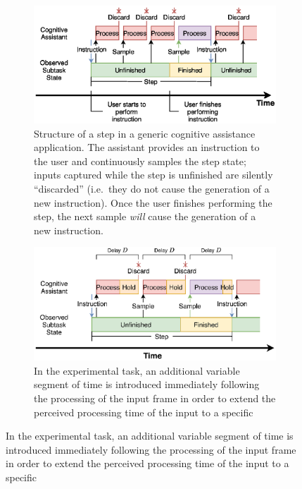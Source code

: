 \begin{figure}[h]
    \centering
    \begin{subfigure}[t]{.49\textwidth}
        \centering
        \includegraphics[width=\textwidth]{publications/2021ImpactDelayedResponse/Fig4a.eps}
        \caption{Structure of a step in a generic cognitive assistance application.
        The assistant provides an instruction to the user and continuously samples the step state; inputs captured
        while the step is unfinished are silently ``discarded'' (i.e.\ they do not cause the generation of a new
        instruction).
        Once the user finishes performing the step, the next sample \emph{will} cause the generation of a new
        instruction.
        }
        \label{fig:cogassist:step}
    \end{subfigure}%
    \hfill%
    \begin{subfigure}[t]{.49\textwidth}
        \centering
        \includegraphics[width=\textwidth]{publications/2021ImpactDelayedResponse/Fig4b.eps}
        \caption{In the experimental task, an additional variable segment of time is introduced immediately following
        the processing of the input frame in order to extend the perceived processing time of the input to a specific
}
\end{subfigure}
\end{figure}
